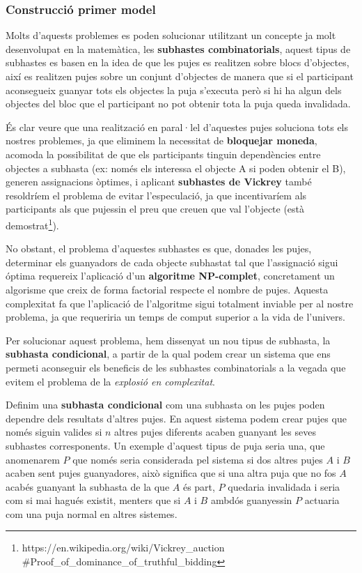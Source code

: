 \documentclass[10pt,twocolumn]{article}
\begin{document}
\subsubsection{Construcció primer model}

Molts d'aquests problemes es poden solucionar utilitzant un concepte ja molt desenvolupat en la matemàtica, les \textbf{subhastes combinatorials}\cite{CA}, aquest tipus de subhastes es basen en la idea de que les pujes es realitzen sobre blocs d'objectes, així es realitzen pujes sobre un conjunt d'objectes de manera que si el participant aconsegueix guanyar tots els objectes la puja s'executa però si hi ha algun dels objectes del bloc que el participant no pot obtenir tota la puja queda invalidada.

És clar veure que una realització en paral·lel d'aquestes pujes soluciona tots els nostres problemes, ja que eliminem la necessitat de \textbf{bloquejar moneda}, acomoda la possibilitat de que els participants tinguin dependències entre objectes a subhasta (ex: només els interessa el objecte A si poden obtenir el B), generen assignacions òptimes, i aplicant \textbf{subhastes de Vickrey} també resoldríem el problema de evitar l'especulació, ja que incentivaríem als participants als  que pujessin el preu que creuen que val l'objecte (està demostrat\footnote{https://en.wikipedia.org/wiki/Vickrey\_auction \\
	\#Proof\_of\_dominance\_of\_truthful\_bidding}).

No obstant, el problema d'aquestes subhastes es que, donades les pujes, determinar els guanyadors de cada objecte subhastat tal que l'assignació sigui óptima requereix l'aplicació d'un \textbf{algoritme NP-complet}, concretament un algorisme que creix de forma factorial respecte el nombre de pujes. Aquesta complexitat fa que l'aplicació de l'algoritme sigui totalment inviable per al nostre problema, ja que requeriria un temps de comput superior a la vida de l'univers.

Per solucionar aquest problema, hem dissenyat un nou tipus de subhasta, la \textbf{subhasta condicional}, a partir de la qual podem crear un sistema que ens permeti aconseguir els beneficis de les subhastes combinatorials a la vegada que evitem el problema de la \textit{explosió en complexitat}.

Definim una \textbf{subhasta condicional} com una subhasta on les pujes poden dependre dels resultats d'altres pujes. En aquest sistema podem crear pujes que només siguin valides si $n$ altres pujes diferents acaben guanyant les seves subhastes corresponents. Un exemple d'aquest tipus de puja seria una, que anomenarem $P$ que només seria considerada pel sistema si dos altres pujes $A$ i $B$ acaben sent pujes guanyadores, això significa que si una altra puja que no fos $A$ acabés guanyant la subhasta de la que $A$ és part, $P$ quedaria invalidada i seria com si mai hagués existit, menters que si $A$ i $B$ ambdós guanyessin $P$ actuaria com una puja normal en altres sistemes.
\end{document}
